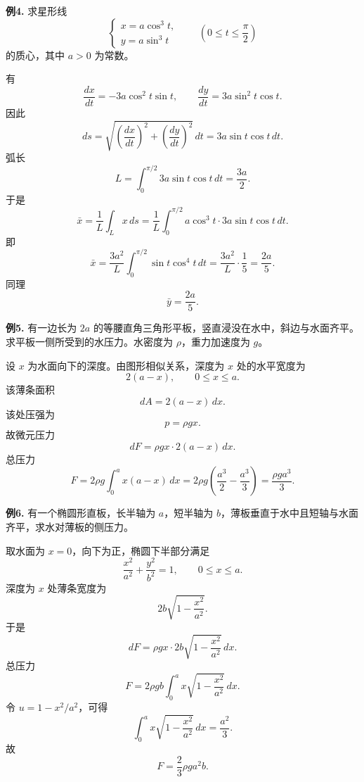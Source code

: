 \begin{problemblock}
\textbf{例4.} 求星形线
\[
\begin{cases}
x=a\cos^3t,\\
y=a\sin^3t
\end{cases}
\qquad \left(0\le t\le\frac{\pi}{2}\right)
\]
的质心，其中 \(a>0\) 为常数。
\end{problemblock}
\begin{solutionblock}
有
\[
\frac{dx}{dt}=-3a\cos^2t\sin t,\qquad
\frac{dy}{dt}=3a\sin^2t\cos t.
\]
因此
\[
ds=\sqrt{\left(\frac{dx}{dt}\right)^2+\left(\frac{dy}{dt}\right)^2}\,dt
=3a\sin t\cos t\,dt.
\]
弧长
\[
L=\int_0^{\pi/2}3a\sin t\cos t\,dt=\frac{3a}{2}.
\]
于是
\[
\bar x=\frac1L\int_L x\,ds
=\frac{1}{L}\int_0^{\pi/2}a\cos^3t\cdot3a\sin t\cos t\,dt.
\]
即
\[
\bar x=\frac{3a^2}{L}\int_0^{\pi/2}\sin t\cos^4t\,dt
=\frac{3a^2}{L}\cdot\frac15
=\frac{2a}{5}.
\]
同理
\[
\bar y=\frac{2a}{5}.
\]
\end{solutionblock}

\begin{problemblock}
\textbf{例5.} 有一边长为 \(2a\) 的等腰直角三角形平板，竖直浸没在水中，斜边与水面齐平。求平板一侧所受到的水压力。水密度为 \(\rho\)，重力加速度为 \(g\)。
\end{problemblock}
\begin{solutionblock}
设 \(x\) 为水面向下的深度。由图形相似关系，深度为 \(x\) 处的水平宽度为
\[
2(a-x),\qquad 0\le x\le a.
\]
该薄条面积
\[
dA=2(a-x)\,dx.
\]
该处压强为
\[
p=\rho gx.
\]
故微元压力
\[
dF=\rho gx\cdot2(a-x)\,dx.
\]
总压力
\[
F=2\rho g\int_0^a x(a-x)\,dx
=2\rho g\left(\frac{a^3}{2}-\frac{a^3}{3}\right)
=\frac{\rho ga^3}{3}.
\]
\end{solutionblock}

\begin{problemblock}
\textbf{例6.} 有一个椭圆形直板，长半轴为 \(a\)，短半轴为 \(b\)，薄板垂直于水中且短轴与水面齐平，求水对薄板的侧压力。
\end{problemblock}
\begin{solutionblock}
取水面为 \(x=0\)，向下为正，椭圆下半部分满足
\[
\frac{x^2}{a^2}+\frac{y^2}{b^2}=1,\qquad 0\le x\le a.
\]
深度为 \(x\) 处薄条宽度为
\[
2b\sqrt{1-\frac{x^2}{a^2}}.
\]
于是
\[
dF=\rho gx\cdot2b\sqrt{1-\frac{x^2}{a^2}}\,dx.
\]
总压力
\[
F=2\rho gb\int_0^a x\sqrt{1-\frac{x^2}{a^2}}\,dx.
\]
令 \(u=1-x^2/a^2\)，可得
\[
\int_0^a x\sqrt{1-\frac{x^2}{a^2}}\,dx=\frac{a^2}{3}.
\]
故
\[
F=\frac{2}{3}\rho ga^2b.
\]
\end{solutionblock}

